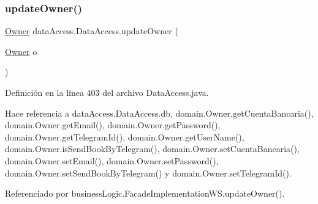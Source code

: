 \subsubsection{\texorpdfstring{updateOwner()}{updateOwner()}}
{\footnotesize\ttfamily \mbox{\hyperlink{classdomain_1_1_owner}{Owner}} data\+Access.\+Data\+Access.\+update\+Owner (\begin{DoxyParamCaption}\item[{\mbox{\hyperlink{classdomain_1_1_owner}{Owner}}}]{o }\end{DoxyParamCaption})}



Definición en la línea 403 del archivo Data\+Access.\+java.


\begin{DoxyCode}{0}

\end{DoxyCode}


Hace referencia a data\+Access.\+Data\+Access.\+db, domain.\+Owner.\+get\+Cuenta\+Bancaria(), domain.\+Owner.\+get\+Email(), domain.\+Owner.\+get\+Password(), domain.\+Owner.\+get\+Telegram\+Id(), domain.\+Owner.\+get\+User\+Name(), domain.\+Owner.\+is\+Send\+Book\+By\+Telegram(), domain.\+Owner.\+set\+Cuenta\+Bancaria(), domain.\+Owner.\+set\+Email(), domain.\+Owner.\+set\+Password(), domain.\+Owner.\+set\+Send\+Book\+By\+Telegram() y domain.\+Owner.\+set\+Telegram\+Id().



Referenciado por business\+Logic.\+Facade\+Implementation\+W\+S.\+update\+Owner().

